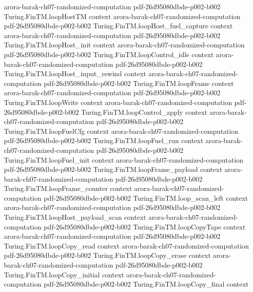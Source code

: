 \begin{theorem}
  {arora-barak-ch07-randomized-computation}
  {pdf-26d95080dbde-p002-b002}
\proofstep
  {Turing.FinTM.loopHostTM}
  {context}
  {arora-barak-ch07-randomized-computation}
  {pdf-26d95080dbde-p002-b002}
\proofstep
  {Turing.FinTM.loopHost_fuel_capture}
  {context}
  {arora-barak-ch07-randomized-computation}
  {pdf-26d95080dbde-p002-b002}
\proofstep
  {Turing.FinTM.loopHost_init}
  {context}
  {arora-barak-ch07-randomized-computation}
  {pdf-26d95080dbde-p002-b002}
\proofstep
  {Turing.FinTM.loopControl_idle}
  {context}
  {arora-barak-ch07-randomized-computation}
  {pdf-26d95080dbde-p002-b002}
\proofstep
  {Turing.FinTM.loopHost_input_rewind}
  {context}
  {arora-barak-ch07-randomized-computation}
  {pdf-26d95080dbde-p002-b002}
\proofstep
  {Turing.FinTM.loopFrame}
  {context}
  {arora-barak-ch07-randomized-computation}
  {pdf-26d95080dbde-p002-b002}
\proofstep
  {Turing.FinTM.loopWrite}
  {context}
  {arora-barak-ch07-randomized-computation}
  {pdf-26d95080dbde-p002-b002}
\proofstep
  {Turing.FinTM.loopControl_apply}
  {context}
  {arora-barak-ch07-randomized-computation}
  {pdf-26d95080dbde-p002-b002}
\proofstep
  {Turing.FinTM.loopFuelCfg}
  {context}
  {arora-barak-ch07-randomized-computation}
  {pdf-26d95080dbde-p002-b002}
\proofstep
  {Turing.FinTM.loopFuel_run}
  {context}
  {arora-barak-ch07-randomized-computation}
  {pdf-26d95080dbde-p002-b002}
\proofstep
  {Turing.FinTM.loopFuel_init}
  {context}
  {arora-barak-ch07-randomized-computation}
  {pdf-26d95080dbde-p002-b002}
\proofstep
  {Turing.FinTM.loopFrame_payload}
  {context}
  {arora-barak-ch07-randomized-computation}
  {pdf-26d95080dbde-p002-b002}
\proofstep
  {Turing.FinTM.loopFrame_counter}
  {context}
  {arora-barak-ch07-randomized-computation}
  {pdf-26d95080dbde-p002-b002}
\proofstep
  {Turing.FinTM.loop_scan_left}
  {context}
  {arora-barak-ch07-randomized-computation}
  {pdf-26d95080dbde-p002-b002}
\proofstep
  {Turing.FinTM.loopHost_payload_scan}
  {context}
  {arora-barak-ch07-randomized-computation}
  {pdf-26d95080dbde-p002-b002}
\proofstep
  {Turing.FinTM.loopCopyTape}
  {context}
  {arora-barak-ch07-randomized-computation}
  {pdf-26d95080dbde-p002-b002}
\proofstep
  {Turing.FinTM.loopCopy_read}
  {context}
  {arora-barak-ch07-randomized-computation}
  {pdf-26d95080dbde-p002-b002}
\proofstep
  {Turing.FinTM.loopCopy_erase}
  {context}
  {arora-barak-ch07-randomized-computation}
  {pdf-26d95080dbde-p002-b002}
\proofstep
  {Turing.FinTM.loopCopy_initial}
  {context}
  {arora-barak-ch07-randomized-computation}
  {pdf-26d95080dbde-p002-b002}
\proofstep
  {Turing.FinTM.loopCopy_final}
  {context}

\end{theorem}
